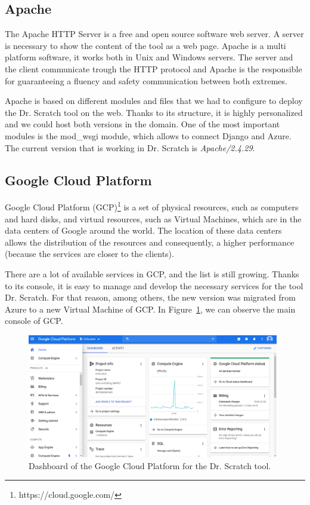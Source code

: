 \subsection{Apache}
\label{subsec:apache}

The Apache HTTP Server is a free and open source software web server. A server is necessary to show the content of the tool as a web page. Apache is a multi platform software, it works both in Unix and Windows servers. The server and the client communicate trough the HTTP protocol and Apache is the responsible for guaranteeing a fluency and safety communication between both extremes.

Apache is based on different modules and files that we had to configure to deploy the Dr. Scratch tool on the web. Thanks to its structure, it is highly personalized and we could host both versions in the domain. One of the most important modules is the mod\_wsgi module, which allows to connect Django and Azure. The current version that is working in Dr. Scratch is \textit{Apache/2.4.29}.  


\subsection{Google Cloud Platform}
\label{subsec:google}

Google Cloud Platform (GCP)\footnote{https://cloud.google.com/} is a set of physical resources, such as computers and hard disks, and virtual resources, such as Virtual Machines, which are in the data centers of Google around the world. The location of these data centers allows the distribution of the resources and consequently, a higher performance (because the services are closer to the clients).

There are a lot of available services in GCP, and the list is still growing. Thanks to its console, it is easy to manage and develop the necessary services for the tool Dr. Scratch. For that reason, among others, the new version was migrated from Azure to a new Virtual Machine of GCP. In Figure~\ref{fig:GCP}, we can observe the main console of GCP.

\begin{figure}
    \centering
        \includegraphics[width=11cm, keepaspectratio]{img/GCP.png}
        \caption{Dashboard of the Google Cloud Platform for the Dr. Scratch tool.}
        \label{fig:GCP}
\end{figure}



